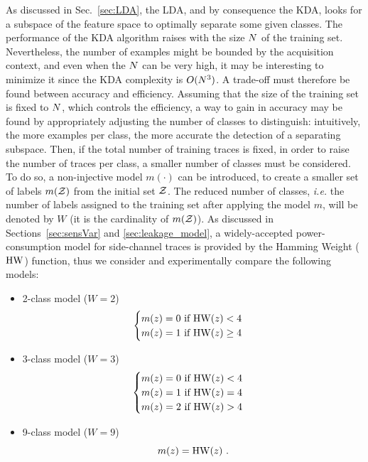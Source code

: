 As discussed in Sec.~\ref{sec:LDA}, the LDA, and by consequence the KDA, looks for a subspace of the feature space to optimally separate some given classes. The performance of the KDA algorithm raises with the size $N$ of the training set. Nevertheless, the number of examples might be bounded by the acquisition context, and even when the $N$ can be very high, it may be interesting to minimize it since the KDA complexity is $O(N^3)$. A trade-off must therefore be found between accuracy and efficiency. Assuming that the size of the training set  is fixed to $N$, which controls the efficiency, a way to gain in accuracy may be found by appropriately adjusting the number of classes to distinguish: intuitively, the more examples per class, the more accurate the detection of a separating subspace. Then, if the total number of training traces is fixed, in order to raise the number of traces per class, a smaller number of classes must be considered. To do so, a non-injective model $m(\cdot)$ can be introduced, to create a smaller set of labels $m(\mathcal{Z})$ from the initial set $\mathcal{Z}$. The reduced number of classes, \emph{i.e.} the number of labels assigned to the training set after applying the model $m$, will be denoted by $W$ (it is the cardinality of $m(\mathcal{Z})$).  As discussed in Sections~\ref{sec:sensVar} and \ref{sec:leakage_model}, a widely-accepted power-consumption model for side-channel traces is provided by the Hamming Weight ($\mathrm{HW}$) function, thus we consider and experimentally compare the following models:
\begin{itemize}
\item 2-class model ($W = 2$)
\begin{equation*}
\begin{cases}
m(z) =0 \mbox{ if } \mathrm{HW}(z)<4 \\
m(z) =1 \mbox{ if } \mathrm{HW}(z)\geq 4
\end{cases}
\end{equation*}

\item 3-class model ($W = 3$)
\begin{equation*}
\begin{cases}
m(z) =0 \mbox{ if } \mathrm{HW}(z)<4 \\
m(z) =1 \mbox{ if } \mathrm{HW}(z) = 4\\
m(z) =2 \mbox{ if } \mathrm{HW}(z)>4 
\end{cases}
\end{equation*}

\item 9-class model ($W = 9$)
\begin{equation*}
m(z) = \mathrm{HW}(z) \mbox{ .} 
\end{equation*}

\end{itemize}

